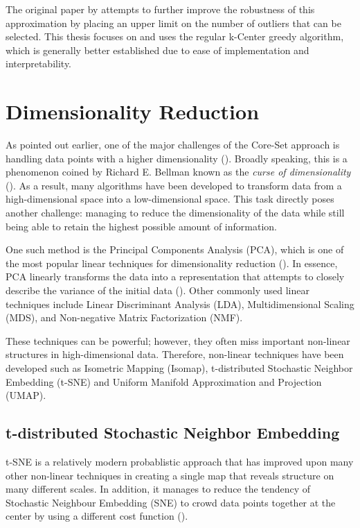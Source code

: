 \documentclass[english,bachelor,ul]{webisthesis} %
\begin{document}
The original paper by \cite{DBLP:conf/iclr/SenerS18} attempts to further improve the robustness of this approximation by placing an upper limit on the number of outliers that can be selected. This thesis focuses on and uses the regular k-Center greedy algorithm, which is generally better established due to ease of implementation and interpretability.

\section{Dimensionality Reduction}


As pointed out earlier, one of the major challenges of the Core-Set approach is handling data points with a higher dimensionality (\cite{DBLP:conf/iccv/SinhaED19}). Broadly speaking, this is a phenomenon coined by Richard E. Bellman known as the \textit{curse of dimensionality} (\cite{franccois2007high}). 
As a result, many algorithms have been developed to transform data from a high-dimensional space into a low-dimensional space. This task directly poses another challenge: managing to reduce the dimensionality of the data while still being able to retain the highest possible amount of information. 

One such method is the Principal Components Analysis (PCA), which is one of the most popular linear techniques for dimensionality reduction (\cite{van2009dimensionality}). In essence, PCA linearly transforms the data into a representation that attempts to closely describe the variance of the initial data (\cite{jolliffe2016principal}). Other commonly used linear techniques include Linear Discriminant Analysis (LDA), Multidimensional Scaling (MDS), and Non-negative Matrix Factorization (NMF).

These techniques can be powerful; however, they often miss important non-linear structures in high-dimensional data. Therefore, non-linear techniques have been developed such as Isometric Mapping (Isomap), t-distributed Stochastic Neighbor Embedding (t-SNE) and Uniform Manifold Approximation and Projection (UMAP). 

\subsection{t-distributed Stochastic Neighbor Embedding}

t-SNE is a relatively modern probablistic approach that has improved upon many other non-linear techniques in creating a single map that reveals structure on many different scales. In addition, it manages to reduce the tendency of Stochastic Neighbour Embedding (SNE) to crowd data points together at the center by using a different cost function (\cite{van2008visualizing}). 
\end{document}

